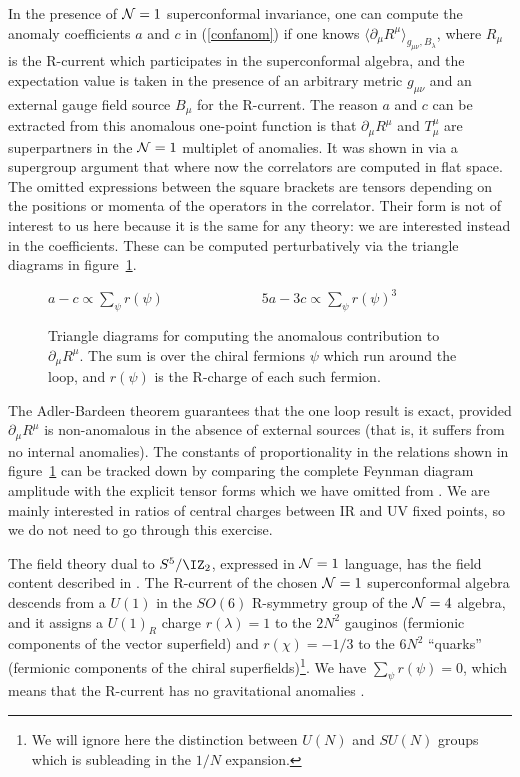 In the presence of ${\cal N}=1$ superconformal invariance, one can compute
the anomaly coefficients $a$ and $c$ in (\ref{confanom}) if one knows $\langle
\partial_\mu R^\mu \rangle_{g_{\mu\nu}, B_\lambda}$, where $R_\mu$ is the
R-current which participates in the superconformal algebra, and the
expectation value is taken in the presence of an arbitrary metric
$g_{\mu\nu}$ and an external gauge field source $B_\mu$ for the R-current.
The reason $a$ and $c$ can be extracted from this anomalous one-point
function is that $\partial_\mu R^\mu$ and $T^\mu_\mu$ are superpartners in
the ${\cal N}=1$ multiplet of anomalies.  It was shown in
\cite{Anselmi:1997am} via a supergroup argument that
 where now the correlators are computed in flat space.  The omitted
expressions between the square brackets are tensors depending on the
positions or momenta of the operators in the correlator.  Their form is not
of interest to us here because it is the same for any theory: we are
interested instead in the coefficients.  These can be computed
perturbatively via the triangle diagrams in figure~\ref{figBssg}.
  \begin{figure}
   \vskip0cm
   \centerline{}
   \vskip-2cm
   \centerline{$\displaystyle{a-c \propto \sum_\psi r(\psi)
     \qquad\qquad\qquad\quad
    5a-3c \propto \sum_\psi r(\psi)^3}$}
   \vskip1.5cm
 \caption{Triangle diagrams for computing the anomalous contribution to
$\partial_\mu R^\mu$.  The sum is over the chiral fermions $\psi$ which run
around the loop, and $r(\psi)$ is the R-charge of each such
fermion.}\label{figBssg}
  \end{figure}
 The Adler-Bardeen theorem guarantees that the one loop result is exact,
provided $\partial_\mu R^\mu$ is non-anomalous in the absence of external
sources (that is, it suffers from no internal anomalies).  The constants of
proportionality in the relations shown in figure~\ref{figBssg} can be
tracked down by comparing the complete Feynman diagram amplitude with the
explicit tensor forms which we have omitted from \acTR.  We are mainly
interested in ratios of central charges between IR and UV fixed points, so
we do not need to go through this exercise.

The field theory dual to $S^5/\IZ_2$, expressed in ${\cal N}=1$
language, has the field content described in \OrbField.  The R-current of
the chosen ${\cal N}=1$ superconformal algebra descends from a $U(1)$ in
the $SO(6)$ R-symmetry group of the ${\cal N}=4$ algebra, and it assigns
a $U(1)_R$ charge
$r(\lambda) = 1$ to the $2N^2$ gauginos (fermionic components of the vector
superfield) and $r(\chi) = -1/3$ to the $6N^2$ ``quarks'' (fermionic
components of the
chiral superfields)\footnote{We will ignore here the distinction
between $U(N)$ and $SU(N)$ groups which is subleading in the $1/N$
expansion.}.  We have $\sum_\psi r(\psi) = 0$, which means that the
R-current has no gravitational anomalies \cite{Alvarez-Gaume:1984ig}.

